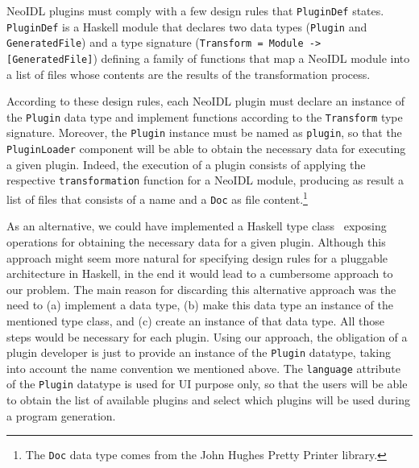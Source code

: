 \documentclass{ws-ijseke}
\newcommand{\neoidl}{NeoIDL}
\begin{document}
\neoidl{} plugins must comply 
with a few design rules that \texttt{PluginDef}
states. \texttt{PluginDef} is a Haskell module that 
declares two data types (\texttt{Plugin} and
\texttt{GeneratedFile}) and a type signature
(\texttt{Transform = Module -> [GeneratedFile]}) 
defining a family of functions that map a \neoidl{} module into 
a list of files whose contents are the results of the 
transformation process.

According to these design rules, each \neoidl{} plugin must declare an instance of the
\texttt{Plugin} data type and implement functions according to the
\texttt{Transform} type signature. Moreover, the 
\texttt{Plugin} instance must be named as \texttt{plugin}, so that the
\texttt{PluginLoader} component will be able to obtain the necessary 
data for executing a given plugin. Indeed, the execution of a plugin
consists of applying the respective \texttt{transformation} function for a
\neoidl{} module, producing as result a list of files that consists of 
a name and a \texttt{Doc} as file content.\footnote{The \texttt{Doc} data type
comes from the John Hughes Pretty Printer library.}  

As an alternative, we could have implemented a Haskell type class~\cite{jones-typeClasses:1995} 
exposing operations for obtaining the necessary data for a given
plugin. Although this approach might seem more natural for specifying
design rules for a pluggable architecture in Haskell, in the end it
would lead to a cumbersome approach to our problem. The main reason
for discarding this alternative approach was the need to (a) implement 
a data type, (b) make this data type an instance of the mentioned type
class, and (c) create an instance of that data type. All those steps
would be necessary for each plugin. Using our approach, the obligation
of a plugin developer is just to provide an instance of the
\texttt{Plugin} datatype, taking into account the name convention we
mentioned above. 
The \texttt{language} attribute of the \texttt{Plugin} datatype
is used for UI purpose only, so that the users will be able to obtain the list of available
plugins and select which plugins will be used during a program generation.  
\end{document}
